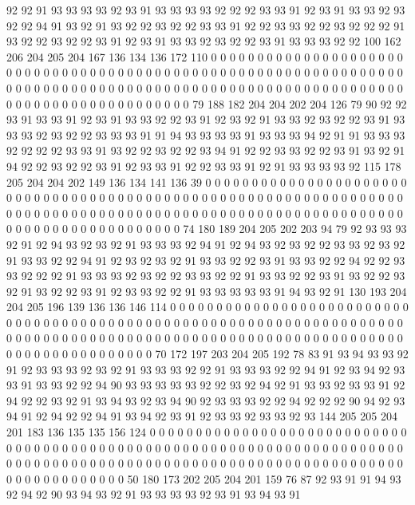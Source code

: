 92 92 91 93 93 93 93 92 93 91 93 93 93 93 92 92 92 93 93 91
92 93 91 93 93 92 93 92 92 94 91 93 92 91 93 92 92 93 92 92
93 93 91 92 92 93 93 92 92 93 92 92 92 91 93 92 92 93 92 92
93 91 92 93 91 93 93 92 93 92 92 93 91 93 93 93 92 92 100 162
206 204 205 204 167 136 134 136 172 110 0 0 0 0 0 0 0 0 0 0
0 0 0 0 0 0 0 0 0 0 0 0 0 0 0 0 0 0 0 0
0 0 0 0 0 0 0 0 0 0 0 0 0 0 0 0 0 0 0 0
0 0 0 0 0 0 0 0 0 0 0 0 0 0 0 0 0 0 0 0
0 0 0 0 0 0 0 0 0 0 0 0 0 0 0 0 0 0 0 0
0 0 0 0 0 0 0 0 0 0 0 0 0 0 0 0 0 0 0 0
0 0 0 0 0 0 0 0 0 0 0 0 0 0 0 0 0 79 188 182
204 204 202 204 126 79 90 92 92 93 91 93 93 91 92 93 91 93 93 92
92 93 91 92 93 92 91 93 93 92 93 92 92 93 91 93 93 93 92 93
92 92 93 93 93 91 91 94 93 93 93 93 91 93 93 93 94 92 91 91
93 93 93 92 92 92 92 93 93 91 93 92 92 93 92 92 93 94 91 92
92 93 93 92 92 93 91 93 92 91 94 92 92 93 92 92 93 91 92 93
93 91 92 92 93 93 91 92 91 93 93 93 93 92 115 178 205 204 204 202
149 136 134 141 136 39 0 0 0 0 0 0 0 0 0 0 0 0 0 0
0 0 0 0 0 0 0 0 0 0 0 0 0 0 0 0 0 0 0 0
0 0 0 0 0 0 0 0 0 0 0 0 0 0 0 0 0 0 0 0
0 0 0 0 0 0 0 0 0 0 0 0 0 0 0 0 0 0 0 0
0 0 0 0 0 0 0 0 0 0 0 0 0 0 0 0 0 0 0 0
0 0 0 0 0 0 0 0 0 0 0 0 0 0 0 0 0 0 0 0
0 0 0 0 0 0 0 0 0 0 0 0 0 74 180 189 204 205 202 203
94 79 92 93 93 93 92 91 92 94 93 92 93 92 91 93 93 93 92 94
91 92 94 93 92 93 92 92 93 93 92 93 92 91 93 93 92 92 94 91
92 93 92 93 92 91 93 93 92 92 93 91 93 93 92 92 94 92 92 93
93 92 92 92 91 93 93 93 92 93 92 92 93 93 92 92 91 93 93 92
92 93 91 93 92 92 93 92 91 93 92 92 93 91 92 93 93 92 92 91
93 93 93 93 93 91 94 93 92 91 130 193 204 204 205 196 139 136 136 146
114 0 0 0 0 0 0 0 0 0 0 0 0 0 0 0 0 0 0 0
0 0 0 0 0 0 0 0 0 0 0 0 0 0 0 0 0 0 0 0
0 0 0 0 0 0 0 0 0 0 0 0 0 0 0 0 0 0 0 0
0 0 0 0 0 0 0 0 0 0 0 0 0 0 0 0 0 0 0 0
0 0 0 0 0 0 0 0 0 0 0 0 0 0 0 0 0 0 0 0
0 0 0 0 0 0 0 0 0 0 0 0 0 0 0 0 0 0 0 0
0 0 0 0 0 0 0 0 0 70 172 197 203 204 205 192 78 83 91 93
94 93 93 92 91 92 93 93 93 92 93 92 91 93 93 93 92 92 91 93
93 93 92 92 94 91 92 93 94 92 93 93 91 93 93 92 92 94 90 93
93 93 93 93 92 92 93 92 94 92 91 93 93 92 93 93 91 92 94 92
92 93 92 91 93 94 93 92 93 94 90 92 93 93 93 92 92 94 92 92
92 90 94 92 93 94 91 92 94 92 92 94 91 93 94 92 93 91 92 93
93 92 93 93 92 93 144 205 205 204 201 183 136 135 135 156 124 0 0 0
0 0 0 0 0 0 0 0 0 0 0 0 0 0 0 0 0 0 0 0
0 0 0 0 0 0 0 0 0 0 0 0 0 0 0 0 0 0 0 0
0 0 0 0 0 0 0 0 0 0 0 0 0 0 0 0 0 0 0 0
0 0 0 0 0 0 0 0 0 0 0 0 0 0 0 0 0 0 0 0
0 0 0 0 0 0 0 0 0 0 0 0 0 0 0 0 0 0 0 0
0 0 0 0 0 0 0 0 0 0 0 0 0 0 0 0 0 0 0 0
0 0 0 0 50 180 173 202 205 204 201 159 76 87 92 93 91 91 94 93
92 94 92 90 93 94 93 92 91 93 93 93 93 92 93 91 93 94 93 91
